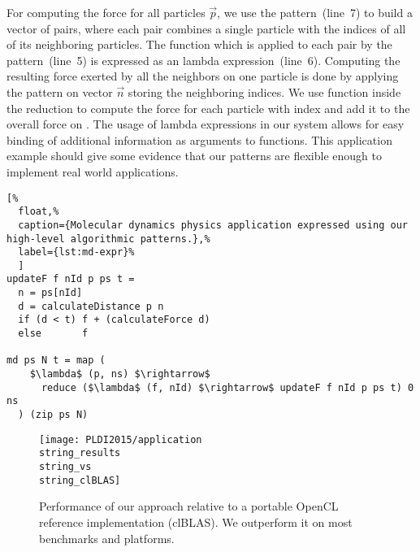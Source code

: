 %
%


For computing the force for all particles $\vec{p}$, we use the  pattern~(line~7) to build a vector of pairs, where each pair combines a single particle with the indices of all of its neighboring particles.
The function which is applied to each pair by the  pattern~(line~5) is expressed as an lambda expression~(line~6).
Computing the resulting force exerted by all the neighbors on one particle is done by applying the  pattern on vector $\vec{n}$ storing the neighboring indices.
We use function  inside the reduction to compute the force for each particle with index  and add it to the overall force on .
The usage of lambda expressions in our system allows for easy binding of additional information as arguments to functions.
This application example should give some evidence that our patterns are flexible enough to implement real world applications.


\begin{lstlisting}[%
  float,%
  caption={Molecular dynamics physics application expressed using our high-level algorithmic patterns.},%
  label={lst:md-expr}%
  ]
updateF f nId p ps t =
  n = ps[nId]
  d = calculateDistance p n
  if (d < t) f + (calculateForce d)
  else       f

md ps N t = map (
    $\lambda$ (p, ns) $\rightarrow$
      reduce ($\lambda$ (f, nId) $\rightarrow$ updateF f nId p ps t) 0 ns
  ) (zip ps N)
\end{lstlisting}

\begin{figure}[t]
  \texttt{[image: PLDI2015/application\\string\_results\\string\_vs\\string\_clBLAS]}
  \caption{Performance of our approach relative to a portable OpenCL reference implementation (clBLAS).
           We outperform it on most benchmarks and platforms.}
  \label{fig:clblas}
\end{figure}



